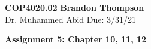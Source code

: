 \noindent
\textbf{COP4020.02} \hfill \textbf{Brandon Thompson} \\
\normalsize Dr. Muhammed Abid \hfill Due: 3/31/21\\

\begin{center}
\textbf{Assignment 5: Chapter 10, 11, 12}
\end{center}